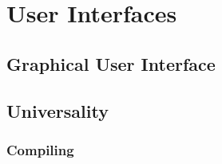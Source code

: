\chapter{User Interfaces}
\section{Graphical User Interface}
\section{Universality}
\subsection{Compiling}

